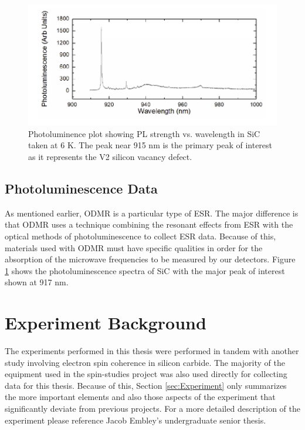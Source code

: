 \documentclass[oneside]{BYUPhys}
\begin{document}
\begin{figure}
    \centerline{\includegraphics{sic_pl_fig}}
    \caption[Photoluminence Spectra of Silicon Carbide]{\label{fig:SiCPL}
      Photoluminence plot showing PL strength vs. wavelength in SiC taken at 6 K. The peak near 915 nm is the primary peak of interest as it represents the V2 silicon vacancy defect.}
 \end{figure}

\subsection{Photoluminescence Data}

As mentioned earlier, ODMR is a particular type of ESR. The major difference is that ODMR uses a technique combining the resonant effects from ESR with the optical methods of photoluminescence to collect ESR data. Because of this, materials used with ODMR must have specific qualities in order for the absorption of the microwave frequencies to be measured by our detectors. Figure \ref{fig:SiCPL} shows the photoluminescence spectra of SiC with the major peak of interest shown at 917 nm.

\section{Experiment Background}

The experiments performed in this thesis were performed in tandem with another study involving electron spin coherence in silicon carbide. The majority of the equipment used in the spin-studies project was also used directly for collecting data for this thesis. Because of this, Section \ref{sec:Experiment} only summarizes the more important elements and also those aspects of the experiment that significantly deviate from previous projects. For a more detailed description of the experiment please reference Jacob Embley's undergraduate senior thesis. \cite{RefWorks:doc:5892912ae4b0dec22aee3993}
\end{document}
